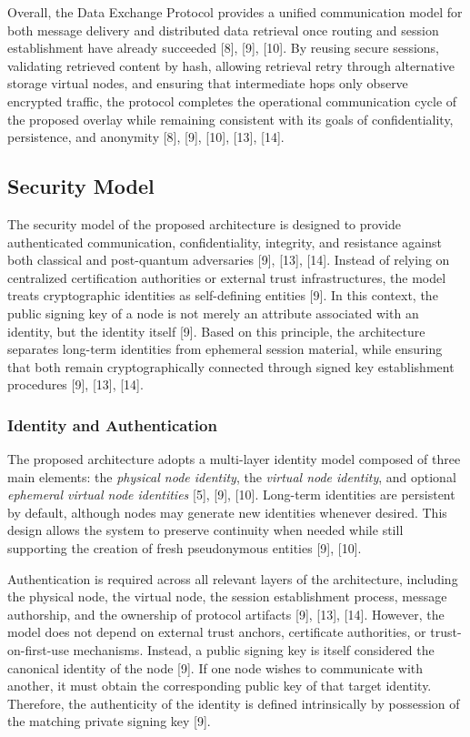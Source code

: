 \documentclass[12pt,a4paper]{article}
\begin{document}
Overall, the Data Exchange Protocol provides a unified communication model for both message delivery and distributed data retrieval once routing and session establishment have already succeeded [8], [9], [10]. By reusing secure sessions, validating retrieved content by hash, allowing retrieval retry through alternative storage virtual nodes, and ensuring that intermediate hops only observe encrypted traffic, the protocol completes the operational communication cycle of the proposed overlay while remaining consistent with its goals of confidentiality, persistence, and anonymity [8], [9], [10], [13], [14].

\subsection{Security Model}

The security model of the proposed architecture is designed to provide authenticated communication, confidentiality, integrity, and resistance against both classical and post-quantum adversaries [9], [13], [14]. Instead of relying on centralized certification authorities or external trust infrastructures, the model treats cryptographic identities as self-defining entities [9]. In this context, the public signing key of a node is not merely an attribute associated with an identity, but the identity itself [9]. Based on this principle, the architecture separates long-term identities from ephemeral session material, while ensuring that both remain cryptographically connected through signed key establishment procedures [9], [13], [14].

\subsubsection{Identity and Authentication}

The proposed architecture adopts a multi-layer identity model composed of three main elements: the \textit{physical node identity}, the \textit{virtual node identity}, and optional \textit{ephemeral virtual node identities} [5], [9], [10]. Long-term identities are persistent by default, although nodes may generate new identities whenever desired. This design allows the system to preserve continuity when needed while still supporting the creation of fresh pseudonymous entities [9], [10].

Authentication is required across all relevant layers of the architecture, including the physical node, the virtual node, the session establishment process, message authorship, and the ownership of protocol artifacts [9], [13], [14]. However, the model does not depend on external trust anchors, certificate authorities, or trust-on-first-use mechanisms. Instead, a public signing key is itself considered the canonical identity of the node [9]. If one node wishes to communicate with another, it must obtain the corresponding public key of that target identity. Therefore, the authenticity of the identity is defined intrinsically by possession of the matching private signing key [9].
\end{document}
